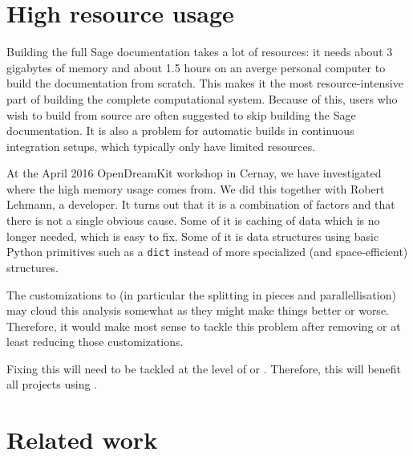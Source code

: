 \documentclass{deliverablereport}
\begin{document}
\section{High resource usage}

Building the full Sage documentation takes a lot of resources:
it needs about 3 gigabytes of memory and about 1.5 hours
on an averge personal computer to build the documentation from scratch.
This makes it the most resource-intensive part of
building the complete \Sage computational system.
Because of this, \Sage users who wish to build from source are often
suggested to skip building the Sage documentation.
It is also a problem for automatic builds in continuous integration
setups, which typically only have limited resources.

At the April 2016 OpenDreamKit workshop in Cernay,
we have investigated where the high memory usage comes from.
We did this together with Robert Lehmann, a \Sphinx developer.
It turns out that it is a combination of factors
and that there is not a single obvious cause.
Some of it is caching of data which is no longer needed,
which is easy to fix.
Some of it is data structures using basic Python primitives such as a \texttt{dict}
instead of more specialized (and space-efficient) structures.

The \Sage customizations to \Sphinx
(in particular the splitting in pieces and parallellisation)
may cloud this analysis somewhat
as they might make things better or worse.
Therefore, it would make most sense to tackle this problem after
removing or at least reducing those customizations.

Fixing this will need to be tackled at the level
of \Docutils or \Sphinx.
Therefore, this will benefit all projects using \Sphinx.

\section{Related work}


\end{document}
